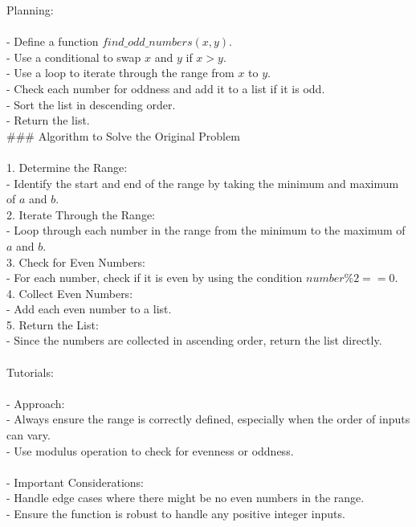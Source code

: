 \*\*Planning:\*\*\\
 \\
- Define a function $find\_odd\_numbers(x, y)$.\\
- Use a conditional to swap $x$ and $y$ if $x > y$.\\
- Use a loop to iterate through the range from $x$ to $y$.\\
- Check each number for oddness and add it to a list if it is odd.\\
- Sort the list in descending order.\\
- Return the list.\\

\#\#\# Algorithm to Solve the Original Problem\\
 \\
1. \*\*Determine the Range:\*\*\\
   - Identify the start and end of the range by taking the minimum and maximum of $a$ and $b$.\\

2. \*\*Iterate Through the Range:\*\*\\
   - Loop through each number in the range from the minimum to the maximum of $a$ and $b$.\\

3. \*\*Check for Even Numbers:\*\*\\
   - For each number, check if it is even by using the condition $number \% 2 == 0$.\\

4. \*\*Collect Even Numbers:\*\*\\
   - Add each even number to a list.\\

5. \*\*Return the List:\*\*\\
   - Since the numbers are collected in ascending order, return the list directly.\\
 \\
\*\*Tutorials:\*\*\\
 \\
- \*\*Approach:\*\*\\
  - Always ensure the range is correctly defined, especially when the order of inputs can vary.\\
  - Use modulus operation to check for evenness or oddness.\\
 \\
- \*\*Important Considerations:\*\*\\
  - Handle edge cases where there might be no even numbers in the range.\\
  - Ensure the function is robust to handle any positive integer inputs.\\

